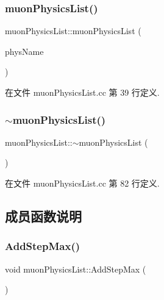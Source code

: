 \subsubsection{\texorpdfstring{muon\+Physics\+List()}{muonPhysicsList()}}
{\footnotesize\ttfamily muon\+Physics\+List\+::muon\+Physics\+List (\begin{DoxyParamCaption}\item[{G4\+String}]{phys\+Name }\end{DoxyParamCaption})}



在文件 muon\+Physics\+List.\+cc 第 39 行定义.

\mbox{\label{classmuonPhysicsList_aadc5d4467f9fa4220be83462d94e28a4}} 
\subsubsection{\texorpdfstring{$\sim$muon\+Physics\+List()}{~muonPhysicsList()}}
{\footnotesize\ttfamily muon\+Physics\+List\+::$\sim$muon\+Physics\+List (\begin{DoxyParamCaption}{ }\end{DoxyParamCaption})\hspace{0.3cm}{\ttfamily [virtual]}}



在文件 muon\+Physics\+List.\+cc 第 82 行定义.



\subsection{成员函数说明}
\mbox{\label{classmuonPhysicsList_a9d96538f586114bd672f975658527527}} 
\subsubsection{\texorpdfstring{Add\+Step\+Max()}{AddStepMax()}}
{\footnotesize\ttfamily void muon\+Physics\+List\+::\+Add\+Step\+Max (\begin{DoxyParamCaption}{ }\end{DoxyParamCaption})}




